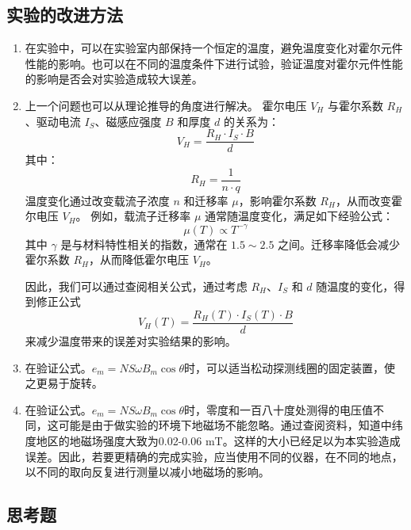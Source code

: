 \documentclass[zihao=5, UTF8]{article}
\theoremstyle{MyLineTheoremStyle} %
\theoremstyle{MyBlockTheoremStyle} %
\theoremstyle{MySubsubsectionStyle} %
\begin{document}
\subsection{实验的改进方法}
\begin{enumerate}
    \item 在实验中，可以在实验室内部保持一个恒定的温度，避免温度变化对霍尔元件性能的影响。也可以在不同的温度条件下进行试验，验证温度对霍尔元件性能的影响是否会对实验造成较大误差。
    \item 上一个问题也可以从理论推导的角度进行解决。
      霍尔电压 \( V_H \) 与霍尔系数 \( R_H \)、驱动电流 \( I_S \)、磁感应强度 \( B \) 和厚度 \( d \) 的关系为：
        \[
        V_H = \frac{R_H \cdot I_S \cdot B}{d}
        \]
        其中：
        \[
        R_H = \frac{1}{n \cdot q}
        \]
        温度变化通过改变载流子浓度 \( n \) 和迁移率 \( \mu \)，影响霍尔系数 \( R_H \)，从而改变霍尔电压 \( V_H \)。
        例如，载流子迁移率 \( \mu \) 通常随温度变化，满足如下经验公式：
        \[
        \mu(T) \propto T^{-\gamma}
        \]
        其中 \( \gamma \) 是与材料特性相关的指数，通常在 \( 1.5 \sim 2.5 \) 之间。迁移率降低会减少霍尔系数 \( R_H \)，从而降低霍尔电压 \( V_H \)。

        因此，我们可以通过查阅相关公式，通过考虑 \( R_H \)、\( I_S \) 和 \( d \) 随温度的变化，得到修正公式
                \[
        V_H(T) = \frac{R_H(T) \cdot I_S(T) \cdot B}{d}
        \]
        来减少温度带来的误差对实验结果的影响。

    \item 在验证公式。$e_m = NS \omega B_m \cos \theta$时，可以适当松动探测线圈的固定装置，使之更易于旋转。
    \item 在验证公式。$e_m = NS \omega B_m \cos \theta$时，零度和一百八十度处测得的电压值不同，这可能是由于做实验的环境下地磁场不能忽略。通过查阅资料，知道中纬度地区的地磁场强度大致为0.02-0.06 mT。这样的大小已经足以为本实验造成误差。因此，若要更精确的完成实验，应当使用不同的仪器，在不同的地点，以不同的取向反复进行测量以减小地磁场的影响。
\end{enumerate}

\subsection{思考题}
\end{document}
